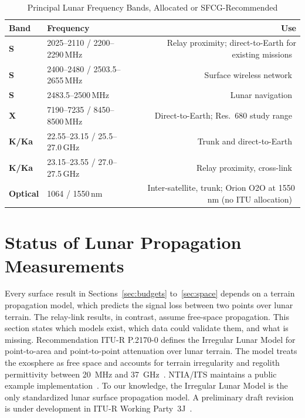 \documentclass{IEEEoj}
\begin{document}
\begin{table}[!t]
\caption{Principal Lunar Frequency Bands, Allocated or SFCG-Recommended}
\label{tab:spectrum}
\centering
\footnotesize
\begin{tabularx}{\columnwidth}{@{}>{\bfseries}llR}
\toprule
{}\textbf{Band} & \textbf{Frequency} & \textbf{Use} \\
\midrule
S & 2025--2110 / 2200--2290\,MHz & Relay proximity; direct-to-Earth for existing missions~\cite{itu_space_research_handbook,sfcg_rec32} \\
S & 2400--2480 / 2503.5--2655\,MHz & Surface wireless network~\cite{sfcg_rec32} \\
S & 2483.5--2500\,MHz & Lunar navigation~\cite{sfcg_rec32} \\
X & 7190--7235 / 8450--8500\,MHz & Direct-to-Earth; Res.~680 study range~\cite{sfcg_rec32,itu_wrc23_res680} \\
K/Ka & 22.55--23.15 / 25.5--27.0\,GHz & Trunk and direct-to-Earth~\cite{lnis_v5} \\
K/Ka & 23.15--23.55 / 27.0--27.5\,GHz & Relay proximity, cross-link~\cite{lnis_v5,sfcg_rec32} \\
Optical & 1064 / 1550\,nm & Inter-satellite, trunk; Orion O2O at 1550\,nm (no ITU allocation)~\cite{nasa_o2o} \\
\bottomrule
\end{tabularx}
\end{table}





\section{Status of Lunar Propagation Measurements}
\label{sec:measurement}
Every surface result in Sections~\ref{sec:budgets} to~\ref{sec:space} depends on a terrain propagation model, which predicts the signal loss between two points over lunar terrain. The relay-link results, in contrast, assume free-space propagation. This section states which models exist, which data could validate them, and what is missing. Recommendation ITU-R P.2170-0 defines the Irregular Lunar Model for point-to-area and point-to-point attenuation over lunar terrain. The model treats the exosphere as free space and accounts for terrain irregularity and regolith permittivity between \SI{20}{MHz} and \SI{37}{GHz}~\cite{itu_p2170}. NTIA/ITS maintains a public example implementation~\cite{ntia_ilm_github}. To our knowledge, the Irregular Lunar Model is the only standardized lunar surface propagation model. A preliminary draft revision is under development in ITU-R Working Party~3J~\cite{itu_p2170_revision}.
\end{document}
